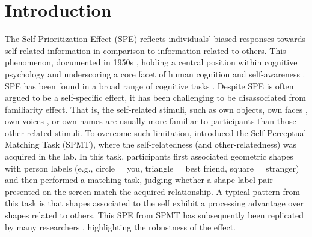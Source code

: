\documentclass[sn-apa]{sn-jnl}%
\theoremstyle{thmstyleone}%
\theoremstyle{thmstyletwo}%
\theoremstyle{thmstylethree}%
\begin{document}

\maketitle

\section{Introduction}\label{sec:intro}

The Self-Prioritization Effect (SPE) reflects individuals' biased responses towards self-related information in comparison to information related to others. This phenomenon, documented in 1950s \parencite{cherry1953some}, holding a central position within cognitive psychology and underscoring a core facet of human cognition and self-awareness \parencite{sui2017the}. SPE has been found in a broad range of cognitive tasks \parencite[e.g.,][]{sui2012perceptual,cunningham2008yours, rogers1977self}. Despite SPE is often argued to be a self-specific effect, it has been challenging to be disassociated from familiarity effect. That is, the self-related stimuli, such as own objects, own faces \parencite{keenan2000self,kircher2000towards,turk2002mike}, own voices \parencite{hughes2013i,payne2021perceptual}, or own names \parencite{constable2019it} are usually more familiar to participants than those other-related stimuli. To overcome such limitation, \textcite{sui2012perceptual} introduced the Self Perceptual Matching Task (SPMT), where the self-relatedness (and other-relatedness) was acquired in the lab. In this task, participants first associated geometric shapes with person labels (e.g., circle = you, triangle = best friend, square = stranger) and then performed a matching task, judging whether a shape-label pair presented on the screen match the acquired relationship. A typical pattern from this task is that shapes associated to the self exhibit a processing advantage over shapes related to others. This SPE from SPMT has subsequently been replicated  by many researchers \parencite{constable2019relevant,golubickis2020parts,golubickis2017self,hu2020good}, highlighting the robustness of the effect. 
\end{document}
